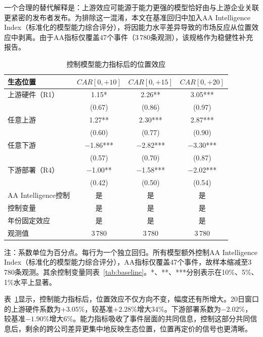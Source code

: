 \documentclass[11pt,fontset=fandol,a4paper]{ctexart}
\newcommand{\changed}[1]{#1}
\begin{document}
一个合理的替代解释是：上游效应可能源于能力更强的模型恰好由与上游企业关联更紧密的发布者发布。为排除这一混淆，本文在基准回归中加入AA Intelligence Index（标准化的模型能力综合评分），将因能力水平差异导致的市场反应从位置效应中剥离。由于AA指标仅覆盖47个事件（3\,780条观测），该规格作为稳健性补充报告。

\begin{table}[H]
\centering
\small
\begin{threeparttable}
\caption{控制模型能力指标后的位置效应}
\label{tab:aa_control}
\begin{tabular}{lccc}
\toprule
生态位置 & $CAR[0,+10]$ & $CAR[0,+15]$ & $CAR[0,+20]$ \\
\midrule
上游硬件（R1） & 1.15* & 2.26** & 3.05*** \\
 & (0.67) & (0.86) & (0.97) \\[3pt]
任意上游 & 1.27** & 2.30*** & 2.87*** \\
 & (0.60) & (0.77) & (0.90) \\[3pt]
任意下游 & $-$1.86*** & $-$2.82*** & $-$3.30*** \\
 & (0.57) & (0.70) & (0.87) \\[3pt]
下游部署（R4） & $-$1.00** & $-$1.58*** & $-$2.02*** \\
 & (0.42) & (0.50) & (0.54) \\
\midrule
AA Intelligence控制 & 是 & 是 & 是 \\
控制变量 & 是 & 是 & 是 \\
年份固定效应 & 是 & 是 & 是 \\
观测值 & 3\,780 & 3\,780 & 3\,780 \\
\bottomrule
\end{tabular}
\begin{tablenotes}
\footnotesize
\item 注：系数单位为百分点。每行为一个独立回归。所有模型额外控制AA Intelligence Index（标准化的模型能力综合评分），AA指标仅覆盖47个事件，故样本缩减至3\,780条观测。其余控制变量同表~\ref{tab:baseline}。*、**、***分别表示在10\%、5\%、1\%水平上显著。
\end{tablenotes}
\end{threeparttable}
\end{table}

\changed{表~\ref{tab:aa_control}显示，控制能力指标后，位置效应不仅方向不变，幅度还有所增大。20日窗口的上游硬件系数为$+3.05\%$，较基准$+2.28\%$增大34\%。下游部署系数为$-2.02\%$，较基准$-1.90\%$增大6\%。能力指标吸收了事件层面的共同信息，控制这部分共同信息后，剩余的跨公司差异更集中地反映生态位置，位置再定价的信号也更清晰。}
\end{document}
